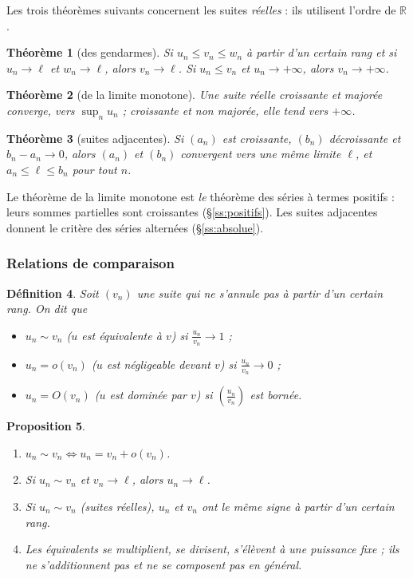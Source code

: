 \documentclass[a4paper,11pt]{article}
\numberwithin{equation}{section}
\numberwithin{figure}{section}
\numberwithin{table}{section}
\theoremstyle{enonce}
\newtheorem{definition}{Définition}[section]
\newtheorem{theoreme}[definition]{Théorème}
\newtheorem{proposition}[definition]{Proposition}
\theoremstyle{exemple}
\theoremstyle{remarque}
\newcommand{\R}{\mathbb{R}}
\begin{document}
Les trois théorèmes suivants concernent les suites \emph{réelles} : ils utilisent l'ordre de $\R$.

\begin{theoreme}[des gendarmes]
Si $u_n\leq v_n\leq w_n$ à partir d'un certain rang et si $u_n\to\ell$ et $w_n\to\ell$, alors $v_n\to\ell$. Si $u_n\leq v_n$ et
$u_n\to+\infty$, alors $v_n\to+\infty$.
\end{theoreme}

\begin{theoreme}[de la limite monotone]\label{t:monotone}
Une suite réelle croissante et majorée converge, vers $\sup_nu_n$ ; croissante et non majorée, elle tend vers $+\infty$.
\end{theoreme}

\begin{theoreme}[suites adjacentes]\label{t:adjacentes}
Si $(a_n)$ est croissante, $(b_n)$ décroissante et $b_n-a_n\to0$, alors $(a_n)$ et $(b_n)$ convergent vers une même limite
$\ell$, et $a_n\leq\ell\leq b_n$ pour tout $n$.
\end{theoreme}

Le théorème de la limite monotone est \emph{le} théorème des séries à termes positifs : leurs sommes partielles sont
croissantes (§\ref{ss:positifs}). Les suites adjacentes donnent le critère des séries alternées (§\ref{ss:absolue}).

\subsubsection*{Relations de comparaison}

\begin{definition}
Soit $(v_n)$ une suite qui ne s'annule pas à partir d'un certain rang. On dit que
\begin{itemize}
\item $u_n\sim v_n$ ($u$ est \emph{équivalente} à $v$) si $\frac{u_n}{v_n}\to1$ ;
\item $u_n=o(v_n)$ ($u$ est \emph{négligeable} devant $v$) si $\frac{u_n}{v_n}\to0$ ;
\item $u_n=O(v_n)$ ($u$ est \emph{dominée} par $v$) si $\left(\frac{u_n}{v_n}\right)$ est bornée.
\end{itemize}
\end{definition}

\begin{proposition}\label{p:equiv}
\begin{enumerate}
\item $u_n\sim v_n\iff u_n=v_n+o(v_n)$.
\item Si $u_n\sim v_n$ et $v_n\to\ell$, alors $u_n\to\ell$.
\item Si $u_n\sim v_n$ (suites réelles), $u_n$ et $v_n$ ont le même signe à partir d'un certain rang.
\item Les équivalents se multiplient, se divisent, s'élèvent à une puissance fixe ; ils \emph{ne s'additionnent pas} et ne se
composent pas en général.
\end{enumerate}
\end{proposition}
\end{document}
